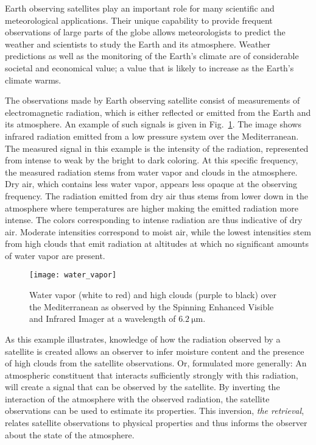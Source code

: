 Earth observing satellites play an important role for many scientific and
meteorological applications. Their unique capability to provide frequent
observations of large parts of the globe allows meteorologists to predict the
weather and scientists to study the Earth and its atmosphere. Weather
predictions as well as the monitoring of the Earth's climate are of considerable
societal and economical value; a value that is likely to increase as the Earth's
climate warms.

The observations made by Earth observing satellite consist of measurements of
electromagnetic radiation, which is either reflected or emitted from the Earth
and its atmosphere. An example of such signals is given in
Fig.~\ref{fig:introduction:water_vapor}. The image shows infrared radiation
emitted from a low pressure system over the Mediterranean. The measured signal
in this example is the intensity of the radiation, represented from intense to
weak by the bright to dark coloring. At this specific frequency, the measured
radiation stems from water vapor and clouds in the atmosphere. Dry air, which
contains less water vapor, appears less opaque at the observing frequency. The
radiation emitted from dry air thus stems from lower down in the atmosphere
where temperatures are higher making the emitted radiation more intense. The
colors corresponding to intense radiation are thus indicative of dry air.
Moderate intensities correspond to moist air, while the lowest intensities stem
from high clouds that emit radiation at altitudes at which no significant
amounts of water vapor are present.

\begin{figure}[h!]
\centering
\texttt{[image: water\_vapor]}
\caption{Water vapor (white to red) and high clouds (purple to black) over the
Mediterranean as observed by the Spinning Enhanced Visible and Infrared
Imager at a wavelength of $\SI{6.2}{\micro \meter}$.}
\label{fig:introduction:water_vapor}
\end{figure}

As this example illustrates, knowledge of how the radiation observed by a
satellite is created allows an observer to infer moisture content and the
presence of high clouds from the satellite observations. Or, formulated more
generally: An atmospheric constituent that interacts sufficiently strongly with
this radiation, will create a signal that can be observed by the satellite. By
inverting the interaction of the atmosphere with the observed radiation, the
satellite observations can be used to estimate its properties. This
inversion, \textit{the retrieval}, relates satellite observations to physical
properties and thus informs the observer about the state of the atmosphere.

